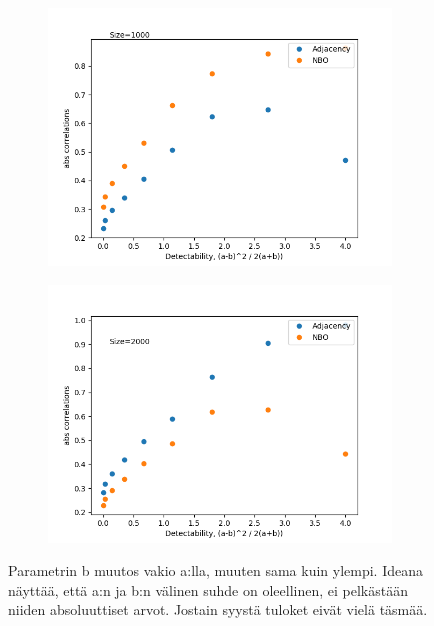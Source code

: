 \documentclass[finnish,12pt,a4paper,pdftex,sci,utf8]{aaltothesis}
\begin{document}
\begin{figure}
	\centering
	\begin{subfigure}[b]{0.45 \textwidth}
		\includegraphics[width = \textwidth]{detectability_b_1.png}
	\end{subfigure}
	\begin{subfigure}[b]{0.45 \textwidth}
		\includegraphics[width = \textwidth]{detectability_b_2.png}
	\end{subfigure}
	\caption{Parametrin b muutos vakio a:lla, muuten sama kuin ylempi. Ideana näyttää, että a:n ja b:n välinen suhde on oleellinen, ei pelkästään niiden absoluuttiset arvot. Jostain syystä tuloket eivät vielä täsmää.}
	\label{fig:b_param}
\end{figure}
\end{document}
